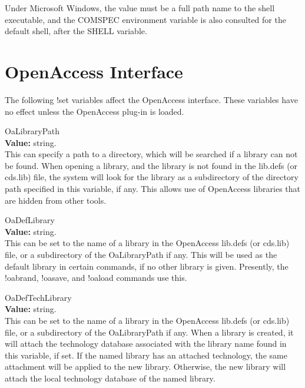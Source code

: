 \begin{description}
Under Microsoft Windows, the value must be a full path name to the
shell executable, and the {\et COMSPEC} environment variable is also
consulted for the default shell, after the {\et SHELL} variable.
\end{description}


\section{OpenAccess Interface}

The following {\cb !set} variables affect the OpenAccess interface. 
These variables have no effect unless the OpenAccess plug-in is
loaded.

\begin{description}
\item{\et OaLibraryPath}\\
{\bf Value:} string.\\
This can specify a path to a directory, which will be searched if a
library can not be found.  When opening a library, and the library is
not found in the {\vt lib.defs} (or {\vt cds.lib}) file, the system
will look for the library as a subdirectory of the directory path
specified in this variable, if any.  This allows use of OpenAccess
libraries that are hidden from other tools.

\item{\et OaDefLibrary}\\
{\bf Value:} string.\\
This can be set to the name of a library in the OpenAccess {\vt
lib.defs} (or {\vt cds.lib}) file, or a subdirectory of the {\et
OaLibraryPath} if any.  This will be used as the default library in
certain commands, if no other library is given.  Presently, the {\cb
!oabrand}, {\cb !oasave}, and {\cb !oaload} commands use this. 

\item{\et OaDefTechLibrary}\\
{\bf Value:} string.\\
This can be set to the name of a library in the OpenAccess {\vt
lib.defs} (or {\vt cds.lib}) file, or a subdirectory of the {\et
OaLibraryPath} if any.  When a library is created, it will attach the
technology database associated with the library name found in this
variable, if set.  If the named library has an attached technology,
the same attachment will be applied to the new library.  Otherwise,
the new library will attach the local technology database of the named
library.


\end{description}
